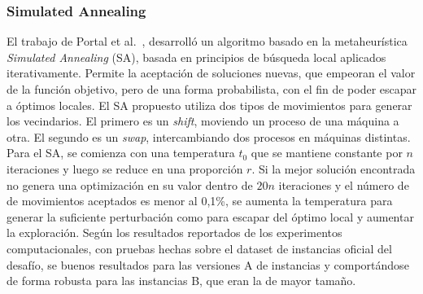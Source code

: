 \documentclass[../informe2.tex]{subfiles}
\begin{document}
\subsubsection{Simulated Annealing}

El trabajo de Portal et al.~\cite{portal2015sa}, desarrolló un algoritmo basado en la metaheurística \textit{Simulated Annealing} (SA), basada en principios de búsqueda local aplicados iterativamente. Permite la aceptación de soluciones nuevas, que empeoran el valor de la función objetivo, pero de una forma probabilista, con el fin de poder escapar a  óptimos locales. El SA propuesto utiliza dos tipos de movimientos para generar los vecindarios. El primero es un \textit{shift}, moviendo un proceso de una máquina a otra. El segundo es un \textit{swap}, intercambiando dos procesos en máquinas distintas. Para el SA, se comienza con una temperatura $t_0$ que se mantiene constante por $n$ iteraciones y luego se reduce en una proporción $r$. Si la mejor solución encontrada no genera una optimización en su valor dentro de $20n$ iteraciones y el número de de movimientos aceptados es menor al 0,1\%, se aumenta la temperatura para generar la suficiente perturbación como para escapar del óptimo local y aumentar la exploración. Según los resultados reportados de los experimentos computacionales, con pruebas hechas sobre el dataset de instancias oficial del desafío, se buenos resultados  para las versiones A de instancias y comportándose de forma robusta para las instancias B, que eran la de mayor tamaño.
\end{document}
